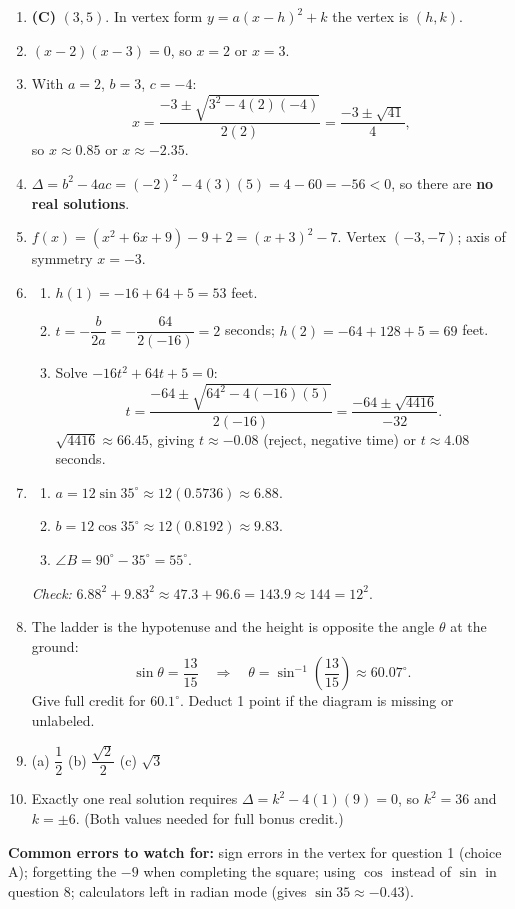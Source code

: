 \documentclass[11pt,addpoints]{exam}
\begin{document}
\begin{enumerate}[label=\textbf{\arabic*.}, leftmargin=*, itemsep=8pt]

  \item \textbf{(C)} $(3, 5)$. In vertex form $y = a(x-h)^2 + k$ the vertex is $(h, k)$.

  \item $(x - 2)(x - 3) = 0$, so $x = 2$ or $x = 3$.

  \item With $a = 2$, $b = 3$, $c = -4$:
  \[
    x = \frac{-3 \pm \sqrt{3^2 - 4(2)(-4)}}{2(2)} = \frac{-3 \pm \sqrt{41}}{4},
  \]
  so $x \approx 0.85$ or $x \approx -2.35$.

  \item $\Delta = b^2 - 4ac = (-2)^2 - 4(3)(5) = 4 - 60 = -56 < 0$, so there are \textbf{no real solutions}.

  \item $f(x) = (x^2 + 6x + 9) - 9 + 2 = (x + 3)^2 - 7$. Vertex $(-3, -7)$; axis of symmetry $x = -3$.

  \item
  \begin{enumerate}[label=(\alph*)]
    \item $h(1) = -16 + 64 + 5 = 53$ feet.
    \item $t = -\dfrac{b}{2a} = -\dfrac{64}{2(-16)} = 2$ seconds; $h(2) = -64 + 128 + 5 = 69$ feet.
    \item Solve $-16t^2 + 64t + 5 = 0$:
    \[
      t = \frac{-64 \pm \sqrt{64^2 - 4(-16)(5)}}{2(-16)} = \frac{-64 \pm \sqrt{4416}}{-32}.
    \]
    $\sqrt{4416} \approx 66.45$, giving $t \approx -0.08$ (reject, negative time) or $t \approx 4.08$ seconds.
  \end{enumerate}

  \item
  \begin{enumerate}[label=(\alph*)]
    \item $a = 12 \sin 35^\circ \approx 12(0.5736) \approx 6.88$.
    \item $b = 12 \cos 35^\circ \approx 12(0.8192) \approx 9.83$.
    \item $\angle B = 90^\circ - 35^\circ = 55^\circ$.
  \end{enumerate}
  \emph{Check:} $6.88^2 + 9.83^2 \approx 47.3 + 96.6 = 143.9 \approx 144 = 12^2$.

  \item The ladder is the hypotenuse and the height is opposite the angle $\theta$ at the ground:
  \[
    \sin\theta = \frac{13}{15} \quad\Longrightarrow\quad \theta = \sin^{-1}\!\left(\frac{13}{15}\right) \approx 60.07^\circ.
  \]
  Give full credit for $60.1^\circ$. Deduct 1 point if the diagram is missing or unlabeled.

  \item (a) $\dfrac{1}{2}$ \qquad (b) $\dfrac{\sqrt{2}}{2}$ \qquad (c) $\sqrt{3}$

  \item[\textbf{Bonus.}] Exactly one real solution requires $\Delta = k^2 - 4(1)(9) = 0$, so $k^2 = 36$ and $k = \pm 6$. (Both values needed for full bonus credit.)

\end{enumerate}

\vspace{6pt}
\noindent\textbf{Common errors to watch for:} sign errors in the vertex for question 1 (choice A); forgetting the $-9$ when completing the square; using $\cos$ instead of $\sin$ in question 8; calculators left in radian mode (gives $\sin 35 \approx -0.43$).
\end{document}
